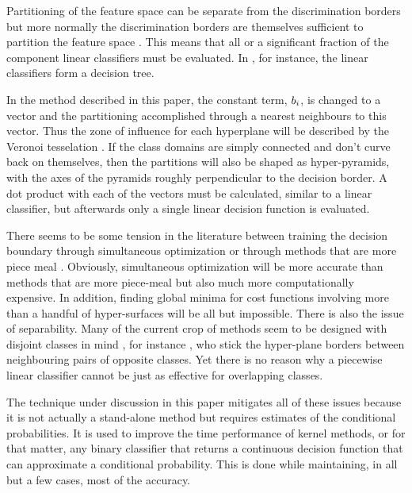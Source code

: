 Partitioning of the feature space can be separate from the discrimination 
borders \citep{Huang_etal2013} but more normally the discrimination borders 
are themselves sufficient to partition the feature space 
\citep{Osborne1977, Lee_Richards1984, Bagirov2005, Kostin2006}.
This means that all or a significant fraction of the component
linear classifiers must be evaluated.
In \citet{Kostin2006}, for instance, the linear classifiers form a decision
tree.

In the method described in this paper, the constant term, $b_i$,
is changed to a vector and the partitioning accomplished through a nearest
neighbours to this vector. 
Thus the zone of influence for each hyperplane
will be described by the Veronoi tesselation \citep{Kohonen2000}.
If the class domains are simply connected and don't curve back on themselves, 
then the partitions will also be shaped as hyper-pyramids, 
with the axes of the pyramids roughly perpendicular to the decision border.
A dot product with each of the vectors must be calculated, similar
to a linear classifier, but afterwards only a single linear decision function is
evaluated.

There seems to be some tension in the literature between training the
decision boundary through simultaneous optimization \citep{Bagirov2005, Wang_Saligrama2013} or through
methods that are more piece meal \citep{Gai_Zhang2010, Herman_Yeung1992, Kostin2006}.
Obviously, simultaneous optimization will be more accurate than methods
that are more piece-meal but also much more computationally expensive.
In addition, finding global minima for cost functions 
involving more than a handful of hyper-surfaces will be all but impossible.
There is also the issue of separability. Many of the current crop of 
methods seem to be designed with disjoint classes in mind \citep{Herman_Yeung1992}, for instance
\citet{Gai_Zhang2010}, who stick the hyper-plane borders between 
neighbouring pairs of opposite classes.
Yet there is no reason why a piecewise linear classifier cannot be just as
effective for overlapping classes.

The technique under discussion in this paper mitigates all of these issues 
because it is not actually a stand-alone method but requires estimates
of the conditional probabilities.
It is used to improve the time performance of kernel methods, or for that matter,
any binary classifier that returns a continuous decision function 
that can approximate a conditional probability.
This is done while maintaining, in all but a few cases, most of the accuracy.

